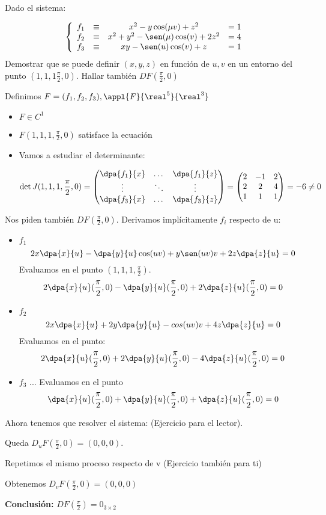 \begin{problem}[19]
Dado el sistema:

\[\left\{\begin{array}{cccc}
	 f_1 &\equiv& x^2 -y\cos(\mu v) + z^2 &= 1\\
	f_2 &\equiv &x^2+y^2-\sen(\mu)\cos(v)+2z^2 &= 4\\
	f_3 &\equiv &xy-\sen(u)\cos(v) + z &= 1 \end{array} \right.\]
Demostrar que se puede definir $(x,y,z)$ en función de $u,v$ en un entorno del punto $(1,1,1\frac{\pi}{2},0) $. Hallar también $DF(\frac{\pi}{2},0) $

\solution

Definimos $F = (f_1,f_2,f_3), \appl{F}{\real^5}{\real^3}$

\begin{itemize}
\item $F \in C^1$
\item $F(1,1,1,\frac{\pi}{2},0)$ satisface la ecuación
\item Vamos a estudiar el determinante:

\[\det J(1,1,1,\frac{\pi}{2},0) =
	\begin{pmatrix}
		\dpa{f_1}{x} &\dots &\dpa{f_1}{z}\\
		\vdots & \ddots &\vdots\\
		\dpa{f_3}{x} & \dots & \dpa{f_3}{z}
	\end{pmatrix} =
	\begin{pmatrix}
		2&-1&2\\
		2&2&4\\
		1&1&1
	\end{pmatrix} = -6 \neq 0\]
\end{itemize}

Nos piden también $DF(\frac{\pi}{2},0)$. Derivamos implícitamente $f_i$ respecto de u:

\begin{itemize}
\item $f_1$
\[2x\dpa{x}{u} - \dpa{y}{u}\cos(uv)+y\sen(uv)v + 2z\dpa{z}{u} =0\]
Evaluamos en el punto $(1,1,1,\frac{\pi}{2})$.
\[2\dpa{x}{u}(\frac{\pi}{2},0) - \dpa{y}{u}(\frac{\pi}{2},0) + 2 \dpa{z}{u}(\frac{\pi}{2},0) = 0\]
 \item $f_2$
 \[2x\dpa{x}{u} + 2y\dpa{y}{u}-cos(uv)v+4z\dpa{z}{u} = 0\]
 Evaluamos en el punto:
 \[2\dpa{x}{u} (\frac{\pi}{2},0)  + 2\dpa{y}{u}(\frac{\pi}{2},0)  - 4 \dpa{z}{u}(\frac{\pi}{2},0) = 0 \]
 \item $f_3$
 ...
 Evaluamos en el punto
 \[\dpa{x}{u}(\frac{\pi}{2},0) +\dpa{y}{u}(\frac{\pi}{2},0)  + \dpa{z}{u}(\frac{\pi}{2},0) = 0 \]
\end{itemize}

Ahora tenemos que resolver el sistema:
(Ejercicio para el lector).

Queda $D_uF(\frac{\pi}{2},0)  = (0,0,0)$.

Repetimos el mismo proceso respecto de v (Ejercicio también para ti)

Obtenemos $D_vF(\frac{\pi}{2},0)  = (0,0,0)$

\textbf{Conclusión:} $DF(\frac{\pi}{2}) = 0_{3\times 2}$
\end{problem}

